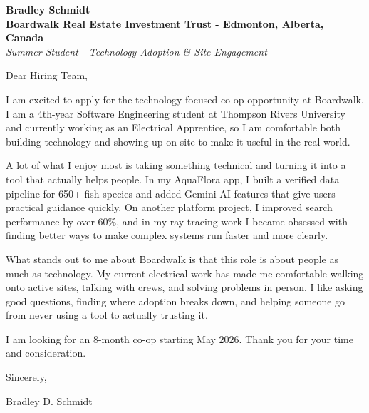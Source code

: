 \documentclass[11pt]{article}
\begin{document}
\textbf{Bradley Schmidt}\\
\vspace{0.5em}
\textbf{Boardwalk Real Estate Investment Trust - Edmonton, Alberta, Canada}\\
\textit{Summer Student - Technology Adoption \& Site Engagement}

Dear Hiring Team,

\par

I am excited to apply for the technology-focused co-op opportunity at Boardwalk. I am a 4th-year Software Engineering student at Thompson Rivers University and currently working as an Electrical Apprentice, so I am comfortable both building technology and showing up on-site to make it useful in the real world.

\par

A lot of what I enjoy most is taking something technical and turning it into a tool that actually helps people. In my AquaFlora app, I built a verified data pipeline for 650+ fish species and added Gemini AI features that give users practical guidance quickly. On another platform project, I improved search performance by over 60\%, and in my ray tracing work I became obsessed with finding better ways to make complex systems run faster and more clearly.

\par

What stands out to me about Boardwalk is that this role is about people as much as technology. My current electrical work has made me comfortable walking onto active sites, talking with crews, and solving problems in person. I like asking good questions, finding where adoption breaks down, and helping someone go from never using a tool to actually trusting it.

\par

I am looking for an 8-month co-op starting May 2026. Thank you for your time and consideration.

\par

Sincerely,

\par

Bradley D. Schmidt
\end{document}
